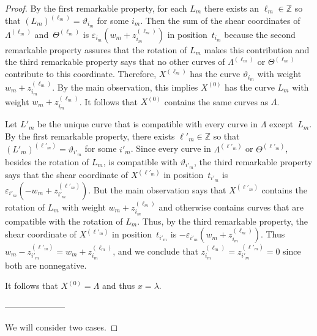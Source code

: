 \documentclass{amsart}
\theoremstyle{definition}
\theoremstyle{remark}
\numberwithin{equation}{section}
\newcommand{\integers}{\mathbb Z}
\newcommand{\ep}{\varepsilon}
\newcommand{\thet}{\vartheta}
\newcommand{\0}{{\mathbf{0}}}
\begin{document}
\begin{proof}
By the first remarkable property, for each $L_m$ there exists an $\ell_m\in\integers$ so that $(L_m)^{(\ell_m)}=\thet_{i_m}$ for some $i_m$.
Then the sum of the shear coordinates of $\Lambda^{(\ell_m)}$ and~$\Theta^{(\ell_m)}$ is $\varepsilon_{i_m}(w_m+z_{i_m}^{(\ell_m)})$ in position~$t_{i_m}$ because the second remarkable property assures that the rotation of $L_m$ makes this contribution and the third remarkable property says that no other curves of $\Lambda^{(\ell_m)}$ or $\Theta^{(\ell_m)}$ contribute to this coordinate.
Therefore, $X^{(\ell_m)}$ has the curve $\thet_{i_m}$ with weight $w_m+z_{i_m}^{(\ell_m)}$.
By the main observation, this implies $X^{(0)}$ has the curve $L_m$ with weight $w_m+z_{i_m}^{(\ell_m)}$.
It follows that $X^{(0)}$ contains the same curves as $\Lambda$.

Let $L'_m$ be the unique curve that is compatible with every curve in $\Lambda$ except~$L_m$.
By the first remarkable property, there exists $\ell'_m\in\integers$ so that $(L'_m)^{(\ell'_m)}=\thet_{i'_m}$ for some $i'_m$.
Since every curve in $\Lambda^{(\ell'_m)}$ or $\Theta^{(\ell'_m)}$, besides the rotation of $L_m$, is compatible with $\thet_{i'_m}$, the third remarkable property says that the shear coordinate of $X^{(\ell'_m)}$ in position~$t_{i'_m}$ is ${\ep_{i'_m}(-w_m+z_{i'_m}^{(\ell'_m)})}$.
But the main observation says that $X^{(\ell'_m)}$ contains the rotation of $L_m$ with weight $w_m+z_{i_m}^{(\ell_m)}$ and otherwise contains curves that are compatible with the rotation of $L_m$.
Thus, by the third remarkable property, the shear coordinate of $X^{(\ell'_m)}$ in position~$t_{i'_m}$ is $-\ep_{i'_m}(w_m+z_{i_m}^{(\ell_m)})$.
Thus $w_m-z_{i'_m}^{(\ell'_m)}=w_m+z_{i_m}^{(\ell_m)}$, and we conclude that $z_{i_m}^{(\ell_m)}=z_{i'_m}^{(\ell'_m)}=0$ since both are nonnegative.

It follows that $X^{(0)}=\Lambda$ and thus $x=\lambda$.

---------------------

We will consider two cases.

\smallskip


\end{proof}
\end{document}
